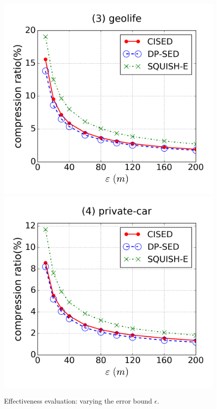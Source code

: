 \begin{figure}[tb!]
\includegraphics[scale = 0.24]{figures/Exp-cr-epsilon-geolife.png}
\includegraphics[scale = 0.24]{figures/Exp-cr-epsilon-private.png}
\vspace{-3ex}
\caption{\small Effectiveness evaluation: varying the error bound $\epsilon$.}
\label{fig:cr}
\vspace{-1.0ex}
\end{figure}


